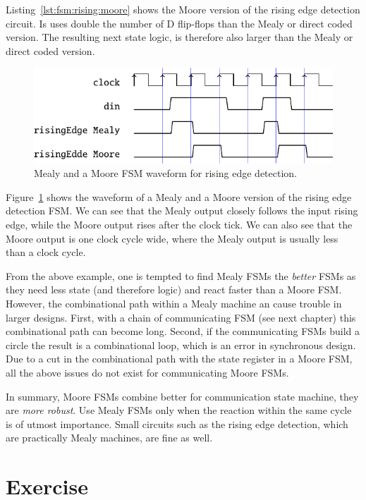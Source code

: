 \documentclass[%
    10pt,
    headinclude, footexclude,
    openright, %
    notitlepage,
    cleardoubleempty,
    headsepline,
    pointlessnumbers,
    bibtotoc, idxtotoc,
    ]{scrbook}
\begin{document}
Listing~\ref{lst:fsm:rising:moore} shows the Moore version of the rising edge detection
circuit. Is uses double the number of D flip-flops than the Mealy or direct
coded version. The resulting next state logic, is therefore also larger
than the Mealy or direct coded version.

\begin{figure}
  \centering
  \includegraphics[scale=1]{figures/rising}
  \caption{Mealy and a  Moore FSM waveform for rising edge detection.}
  \label{fig:rising}
\end{figure}

Figure~\ref{fig:rising} shows the waveform of a Mealy and a  Moore version
of the rising edge detection FSM. We can see that the Mealy output closely
follows the input rising edge, while the Moore output rises after the clock tick.
We can also see that the Moore output is one clock cycle wide, where the Mealy
output is usually less than a clock cycle.

From the above example, one is tempted to find Mealy FSMs the \emph{better}
FSMs as they need less state (and therefore logic) and react faster than a Moore FSM.
However, the combinational path within a Mealy machine an cause trouble in
larger designs. First, with a chain of communicating FSM (see next chapter) this
combinational path can become long. Second, if the communicating FSMs build
a circle the result is a combinational loop, which is an error in synchronous design.
Due to a cut in the combinational path with the state register in a Moore FSM,
all the above issues do not exist for communicating Moore FSMs.

In summary, Moore FSMs combine better for communication state machine, they
are \emph{more robust}. Use Mealy FSMs only when the reaction within the same
cycle is of utmost importance. Small circuits such as the rising edge detection,
which are practically Mealy machines, are fine as well.

\section{Exercise}
\end{document}
